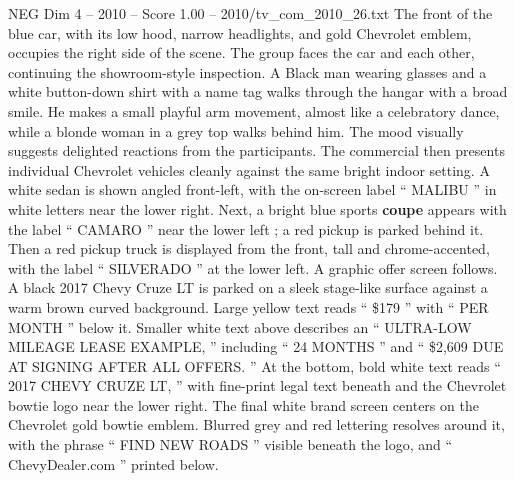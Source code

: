\begin{textsample}{NEG Dim 4 – 2010 – Score 1.00 – 2010/tv\_com\_2010\_26.txt}
The front of the blue car, with its low hood, narrow headlights, and gold Chevrolet emblem, occupies the right side of the scene.
The group faces the car and each other, continuing the showroom-style inspection.
A Black man wearing glasses and a white button-down shirt with a name tag walks through the hangar with a broad smile.
He makes a small playful arm movement, almost like a celebratory dance, while a blonde woman in a grey top walks behind him.
The mood visually suggests delighted reactions from the participants.
The commercial then presents individual Chevrolet vehicles cleanly against the same bright indoor setting.
A white sedan is shown angled front-left, with the on-screen label “ MALIBU ” in white letters near the lower right.
Next, a bright blue sports \textbf{coupe} appears with the label “ CAMARO ” near the lower left ; a red pickup is parked behind it.
Then a red pickup truck is displayed from the front, tall and chrome-accented, with the label “ SILVERADO ” at the lower left.
A graphic offer screen follows.
A black 2017 Chevy Cruze LT is parked on a sleek stage-like surface against a warm brown curved background.
Large yellow text reads “ \$179 ” with “ PER MONTH ” below it.
Smaller white text above describes an “ ULTRA-LOW MILEAGE LEASE EXAMPLE, ” including “ 24 MONTHS ” and “ \$2,609 DUE AT SIGNING AFTER ALL OFFERS. ” At the bottom, bold white text reads “ 2017 CHEVY CRUZE LT, ” with fine-print legal text beneath and the Chevrolet bowtie logo near the lower right.
The final white brand screen centers on the Chevrolet gold bowtie emblem.
Blurred grey and red lettering resolves around it, with the phrase “ FIND NEW ROADS ” visible beneath the logo, and “ ChevyDealer.com ” printed below.

\end{textsample}
